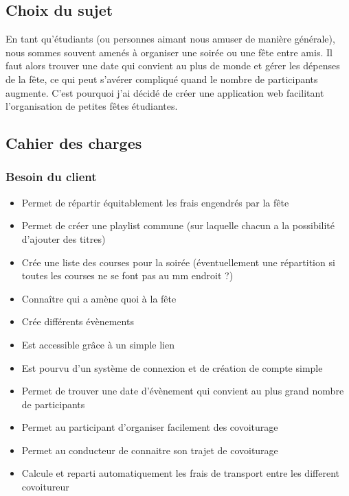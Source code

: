 
\subsection{Choix du sujet}\label{subsec:choix-du-sujet}
En tant qu’étudiants (ou personnes aimant nous amuser de manière générale), nous sommes souvent amenés à organiser une soirée ou une fête entre amis.
Il faut alors trouver une date qui convient au plus de monde et gérer les dépenses de la fête, ce qui peut s'avérer compliqué quand le nombre de participants augmente.
C’est pourquoi j’ai décidé de créer une application web facilitant l’organisation de petites fêtes étudiantes.

\subsection{Cahier des charges}\label{subsec:cahier-des-charges}
\subsubsection{Besoin du client}
\begin{itemize}
    \item Permet de répartir équitablement les frais engendrés par la fête
    \item Permet de créer une playlist commune (sur laquelle chacun a la possibilité d'ajouter des titres)
    \item Crée une liste des courses pour la soirée (éventuellement une répartition si toutes les courses ne se font pas au mm endroit ?)
    \item Connaître qui a amène quoi à la fête
    \item Crée différents évènements
    \item Est accessible grâce à un simple lien
    \item Est pourvu d'un système de connexion et de création de compte simple
    \item Permet de trouver une date d’évènement qui convient au plus grand nombre de participants
    \item Permet au participant d'organiser facilement des covoiturage
    \item Permet au conducteur de connaitre son trajet de covoiturage
    \item Calcule et reparti automatiquement les frais de transport entre les different covoitureur
\end{itemize}
